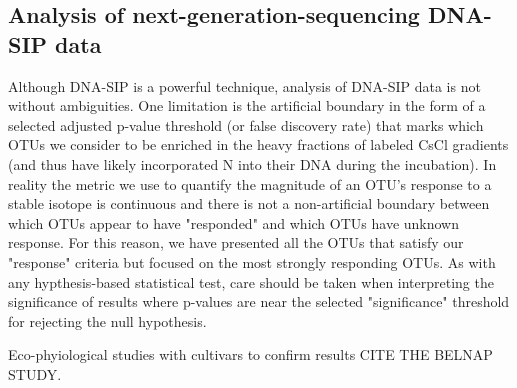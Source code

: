 \subsection{Analysis of next-generation-sequencing DNA-SIP data}
Although DNA-SIP is a powerful technique, analysis of DNA-SIP data is not without ambiguities. One limitation is the artificial boundary in the form of a selected adjusted p-value threshold (or false discovery rate) that marks which OTUs we consider to be enriched in the heavy fractions of labeled CsCl gradients (and thus have likely incorporated N into their DNA during the incubation). In reality the metric we use to quantify the magnitude of an OTU's response to a stable isotope is continuous and there is not a non-artificial boundary between which OTUs appear to have "responded" and which OTUs have unknown response. For this reason, we have presented all the OTUs that satisfy our "response" criteria but focused on the most strongly responding OTUs. As with any hypthesis-based statistical test, care should be taken when interpreting the significance of results where p-values are near the selected "significance" threshold for rejecting the null hypothesis.

Eco-phyiological studies with cultivars to confirm results CITE THE BELNAP STUDY.

